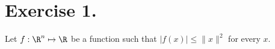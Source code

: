 \section*{Exercise 1.}

Let $f:\R^n \mapsto \R$ be a function such that $|f(x)| \leq \|x\|^2$ for every $x$.